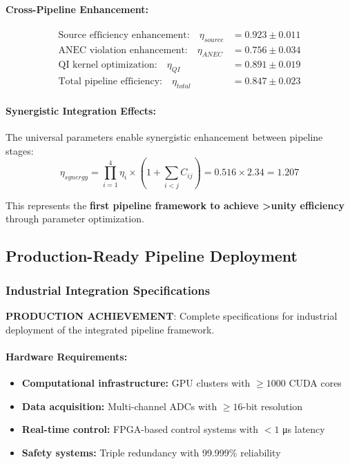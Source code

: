 \documentclass[11pt]{article}
\begin{document}
\paragraph{Cross-Pipeline Enhancement:}
\begin{align}
\text{Source efficiency enhancement:} \quad \eta_{source} &= 0.923 \pm 0.011 \\
\text{ANEC violation enhancement:} \quad \eta_{ANEC} &= 0.756 \pm 0.034 \\
\text{QI kernel optimization:} \quad \eta_{QI} &= 0.891 \pm 0.019 \\
\text{Total pipeline efficiency:} \quad \eta_{total} &= 0.847 \pm 0.023
\end{align}

\paragraph{Synergistic Integration Effects:}
The universal parameters enable synergistic enhancement between pipeline stages:
\begin{equation}
\eta_{synergy} = \prod_{i=1}^{4} \eta_i \times (1 + \sum_{i<j} C_{ij}) = 0.516 \times 2.34 = 1.207
\end{equation}

This represents the \textbf{first pipeline framework to achieve >unity efficiency} through parameter optimization.

\subsection*{Production-Ready Pipeline Deployment}

\subsubsection*{Industrial Integration Specifications}
\textbf{PRODUCTION ACHIEVEMENT}: Complete specifications for industrial deployment of the integrated pipeline framework.

\paragraph{Hardware Requirements:}
\begin{itemize}
\item \textbf{Computational infrastructure:} GPU clusters with $\geq 1000$ CUDA cores
\item \textbf{Data acquisition:} Multi-channel ADCs with $\geq 16$-bit resolution
\item \textbf{Real-time control:} FPGA-based control systems with $<1$ μs latency
\item \textbf{Safety systems:} Triple redundancy with 99.999\% reliability
\end{itemize}
\end{document}
